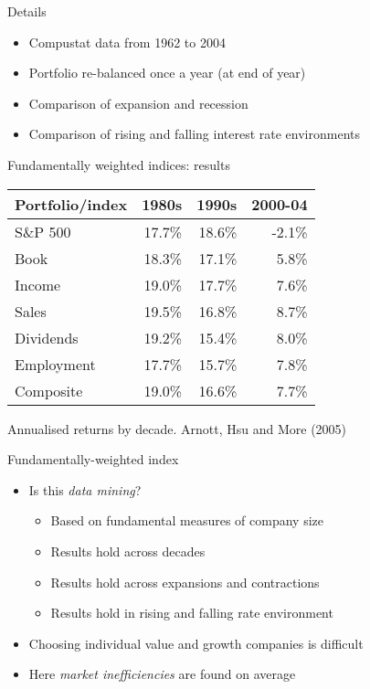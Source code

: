 \documentclass[14pt,xcolor=pdftex,dvipsnames,table]{beamer}\usepackage[]{graphicx}\usepackage[]{color}
\begin{document}
\begin{frame}{Details}
\begin{itemize}[<+-| alert@+>]
\item Compustat data from 1962 to 2004
\item Portfolio re-balanced once a year (at end of year)
\item Comparison of expansion and recession
\item Comparison of rising and falling interest rate environments
\end{itemize}
\end{frame}

\begin{frame}{Fundamentally weighted indices: results}
\begin{table}
\begin{center}
\begin{tabular}{l r r r}
\textbf{Portfolio/index} & \textbf{1980s} & \textbf{1990s} & \textbf{2000-04}\\
\hline
S\&P 500 & 17.7\% & 18.6\% & -2.1\% \\
Book & 18.3\%     & 17.1\% & 5.8\%\\
Income & 19.0\%   & 17.7\% & 7.6\% \\
Sales & 19.5\%    & 16.8\% & 8.7\% \\
Dividends & 19.2\% & 15.4\% & 8.0\% \\
Employment & 17.7\% & 15.7\% & 7.8\%\\
Composite & 19.0\% & 16.6\% & 7.7\% 
\end{tabular}
\end{center}
\end{table}
Annualised returns by decade.  Arnott, Hsu and More (2005)
\end{frame}

\begin{frame}{Fundamentally-weighted index}
\begin{itemize}[<+-| alert@+>]
\item Is this \emph{data mining}?
\begin{itemize}
\item Based on fundamental measures of company size
\item Results hold across decades 
\item Results hold across expansions and contractions
\item Results hold in rising and falling rate environment
\end{itemize}
\item Choosing individual value and growth companies is difficult
\item Here \emph{market inefficiencies} are found on average
\end{itemize}
\end{frame}
\end{document}
